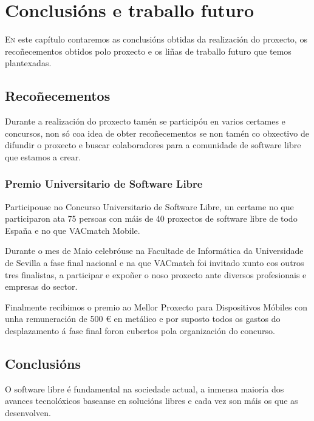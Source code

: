 \chapter{Conclusións e traballo futuro}
\minitoc


  \lettrine{E}{n} este capítulo contaremos as conclusións obtidas da 
realización do proxecto, os recoñecementos obtidos polo proxecto e os liñas de 
traballo futuro que temos plantexadas.

\section{Recoñecementos}

Durante a realización do proxecto tamén se participóu en varios certames e 
concursos, non só coa idea de obter recoñecementos se non tamén co obxectivo de 
difundir o proxecto e buscar colaboradores para a comunidade de software libre 
que estamos a crear.

  \subsection{Premio Universitario de Software Libre}
  Participouse no Concurso Universitario de Software Libre, un certame no que 
participaron ata 75 persoas con máis de 40 proxectos de software libre de todo 
España e no que VACmatch Mobile.

  Durante o mes de Maio celebróuse na Facultade de Informática da Universidade 
de Sevilla a fase final nacional e na que VACmatch foi invitado xunto cos 
outros tres finalistas, a participar e expoñer o noso proxecto ante diversos 
profesionais e empresas do sector.

  Finalmente recibimos o premio ao Mellor Proxecto para Dispositivos Móbiles 
con unha remuneración de 500 \euro{} en metálico e por suposto todos os gastos 
do desplazamento á fase final foron cubertos pola organización do concurso.

\section{Conclusións}
O software libre é fundamental na sociedade actual, a inmensa maioría dos 
avances tecnolóxicos baseanse en solucións libres e cada vez son máis os que  
as desenvolven.

